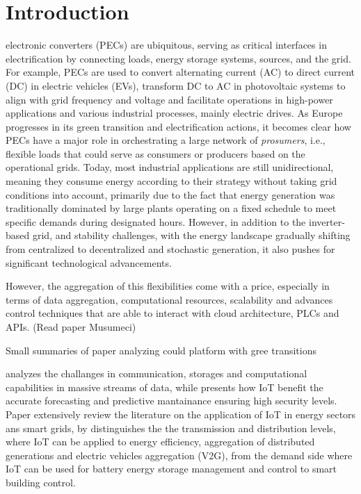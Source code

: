 
\section{Introduction}

 electronic converters (PECs) are ubiquitous, serving as critical interfaces in electrification by connecting loads, energy storage systems, sources, and the grid. For example, PECs are used to convert alternating current (AC) to direct current (DC) in electric vehicles (EVs), transform DC to AC in photovoltaic systems to align with grid frequency and voltage and facilitate operations in high-power applications and various industrial processes, mainly electric drives. 
As Europe progresses in its green transition and electrification actions, 
it becomes clear how PECs have a major role in orchestrating 
a large network of \textit{prosumers}, i.e., flexible loads that could serve as consumers or producers based on the operational
grids. Today, most industrial applications are still unidirectional, meaning they consume energy according to their strategy without taking grid conditions into account, primarily due to the fact that energy generation was traditionally dominated by large plants operating on a fixed schedule to meet specific demands during designated hours.
However, in addition to the inverter-based grid, and stability challenges,
with the energy landscape gradually shifting from centralized to decentralized and stochastic generation, it also pushes for significant technological advancements. 


However, the aggregation of this flexibilities come with a price,
especially in terms of data aggregation, computational resources, scalability and advances control 
techniques that are able to interact with cloud architecture, PLCs and APIs. (Read paper Musumeci) 


Small summaries of paper analyzing could platform with gree transitions


\cite{bagherzadeh2020integration} analyzes the challanges in communication, storages and computational capabilities in 
massive streams of data, while \cite{shahinzadeh2018green} presents how IoT benefit the accurate forecasting and predictive mantainance ensuring high security levels. 
Paper \cite{hossein2020internet} extensively review the literature on the application of IoT in energy sectors ans smart grids, by 
distinguishes the the transmission and distribution levels, where IoT can be applied to energy efficiency, aggregation of distributed generations and electric vehicles
aggregation (V2G), from the demand side where IoT can be used for battery energy storage management and control to smart building control. 

